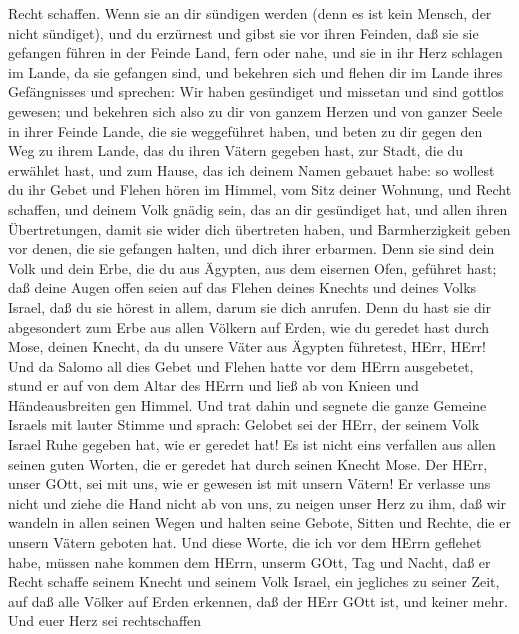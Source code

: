Recht schaffen.  Wenn sie an dir sündigen werden (denn es
ist kein Mensch, der nicht sündiget), und du erzürnest und gibst sie vor
ihren Feinden, daß sie sie gefangen führen in der Feinde Land, fern oder
nahe,  und sie in ihr Herz schlagen im Lande, da sie
gefangen sind, und bekehren sich und flehen dir im Lande ihres
Gefängnisses und sprechen: Wir haben gesündiget und missetan und sind
gottlos gewesen;  und bekehren sich also zu dir von ganzem
Herzen und von ganzer Seele in ihrer Feinde Lande, die sie weggeführet
haben, und beten zu dir gegen den Weg zu ihrem Lande, das du ihren
Vätern gegeben hast, zur Stadt, die du erwählet hast, und zum Hause, das
ich deinem Namen gebauet habe:  so wollest du ihr Gebet und
Flehen hören im Himmel, vom Sitz deiner Wohnung, und Recht schaffen,
 und deinem Volk gnädig sein, das an dir gesündiget hat,
und allen ihren Übertretungen, damit sie wider dich übertreten haben,
und Barmherzigkeit geben vor denen, die sie gefangen halten, und dich
ihrer erbarmen.  Denn sie sind dein Volk und dein Erbe, die
du aus Ägypten, aus dem eisernen Ofen, geführet hast;  daß
deine Augen offen seien auf das Flehen deines Knechts und deines Volks
Israel, daß du sie hörest in allem, darum sie dich anrufen.
 Denn du hast sie dir abgesondert zum Erbe aus allen
Völkern auf Erden, wie du geredet hast durch Mose, deinen Knecht, da du
unsere Väter aus Ägypten führetest, HErr, HErr!  Und da
Salomo all dies Gebet und Flehen hatte vor dem HErrn ausgebetet, stund
er auf von dem Altar des HErrn und ließ ab von Knieen und
Händeausbreiten gen Himmel.  Und trat dahin und segnete die
ganze Gemeine Israels mit lauter Stimme und sprach: 
Gelobet sei der HErr, der seinem Volk Israel Ruhe gegeben hat, wie er
geredet hat! Es ist nicht eins verfallen aus allen seinen guten Worten,
die er geredet hat durch seinen Knecht Mose.  Der HErr,
unser GOtt, sei mit uns, wie er gewesen ist mit unsern Vätern! Er
verlasse uns nicht und ziehe die Hand nicht ab von uns,  zu
neigen unser Herz zu ihm, daß wir wandeln in allen seinen Wegen und
halten seine Gebote, Sitten und Rechte, die er unsern Vätern geboten
hat.  Und diese Worte, die ich vor dem HErrn geflehet habe,
müssen nahe kommen dem HErrn, unserm GOtt, Tag und Nacht, daß er Recht
schaffe seinem Knecht und seinem Volk Israel, ein jegliches zu seiner
Zeit,  auf daß alle Völker auf Erden erkennen, daß der HErr
GOtt ist, und keiner mehr.  Und euer Herz sei rechtschaffen
